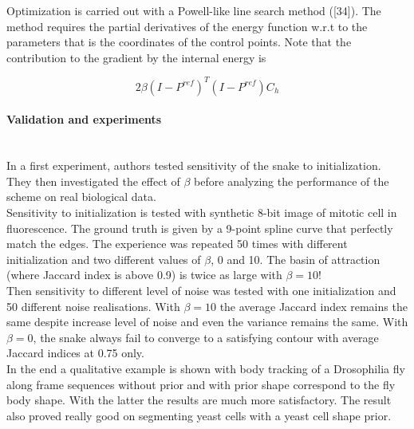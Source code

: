 \documentclass[a4paper, 11pt]{article}
\begin{document}
Optimization is carried out with a Powell-like line search method ([34]). The method requires the partial derivatives of 
the energy function w.r.t to the parameters that is the coordinates of the control points. Note that the contribution to 
the gradient by the internal energy is 

\begin{equation}
  2 \beta {\left(I-P^{ref}\right)}^T\left(I-P^{ref}\right) C_h
\end{equation}

\paragraph{Validation and experiments} \mbox{} \\ 

In a first experiment, authors tested sensitivity of the snake to initialization. They then investigated the effect of 
$\beta$ before analyzing the performance of the scheme on real biological data. \\ 

Sensitivity to initialization is tested with synthetic 8-bit image of mitotic cell in fluorescence. The ground truth is 
given by a 9-point spline curve that perfectly match the edges. The experience was repeated 50 times with different 
initialization and two different values of $\beta$, 0 and 10. The basin of attraction (where Jaccard index is above 0.9) 
is twice as large with $\beta = 10$! \\

Then sensitivity to different level of noise was tested with one initialization and 50 different noise realisations.  
With $\beta=10$ the average Jaccard index remains the same despite increase level of noise and even the variance remains 
the same. With $\beta=0$, the snake always fail to converge to a satisfying contour with average Jaccard indices at 0.75 
only. \\ 

In the end a qualitative example is shown with body tracking of a Drosophilia fly along frame sequences without prior 
and with prior shape correspond to the fly body shape. With the latter the results are much more satisfactory. The 
result also proved really good on segmenting yeast cells with a yeast cell shape prior. 
\end{document}
